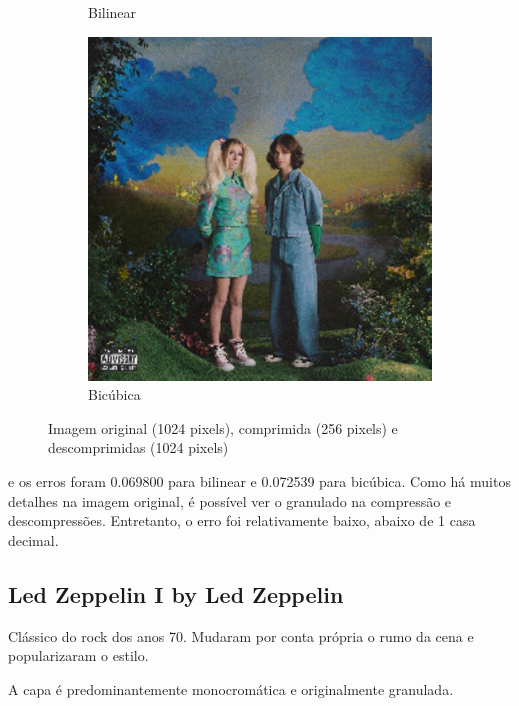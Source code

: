 \documentclass{article}
\begin{document}
\begin{figure}[ht]
\begin{subfigure}{0.48\textwidth}
    \caption{Bilinear}
  \end{subfigure}%
  \hfill
  \begin{subfigure}{0.48\textwidth}
    \centering
    \includegraphics[width=\textwidth]{imagens-reais/not-tight/decompressed-bicubica.png}
    \caption{Bicúbica}
  \end{subfigure}
  \caption{Imagem original (1024 pixels), comprimida (256 pixels) e descomprimidas (1024 pixels)}
\end{figure}

e os erros foram 0.069800 para bilinear e 0.072539 para bicúbica.
Como há muitos detalhes na imagem original, é possível ver o
granulado na compressão e descompressões. Entretanto, o erro foi
relativamente baixo, abaixo de 1 casa decimal.

\subsection{Led Zeppelin I by Led Zeppelin}

Clássico do rock dos anos 70. Mudaram por conta própria o rumo da
cena e popularizaram o estilo.

A capa é predominantemente monocromática e originalmente granulada.
\end{document}
